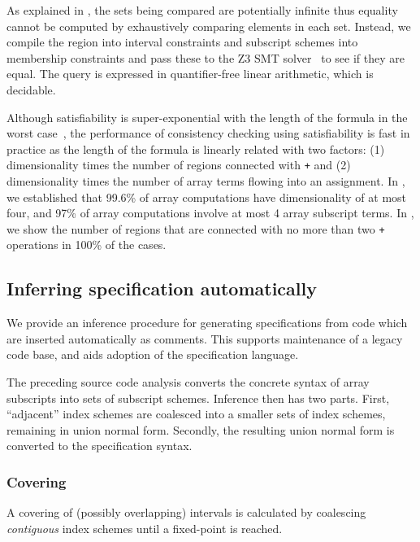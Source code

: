 As explained in , the sets being compared are
potentially infinite thus equality cannot be computed by exhaustively
comparing elements in each set. Instead, we compile the region into
interval constraints and subscript schemes into membership constraints and pass
these to the \textsc{Z3} SMT solver~\citep{de2008z3} to see if they are equal. The
query is expressed in quantifier-free linear arithmetic, which is decidable.

Although satisfiability is super-exponential with the length of the formula in
the worst case~\cite{fischer1974super}, the performance of consistency checking
using satisfiability is fast in practice as the length of the formula is linearly
related with two factors: (1) dimensionality times the number of regions connected
with \texttt{+} and (2) dimensionality times the number of array terms flowing
into an assignment. In , we
established that  99.6\% of array computations have 
dimensionality of at most four, and 97\% of array computations
involve at most 4 array subscript terms. In
, we show the number of regions that are
connected with no more than two \texttt{+} operations in 100\% of the cases.


\subsection{Inferring specification automatically}
\label{subsec:inference}
%
\noindent
We provide an inference procedure for generating specifications from
code which are inserted automatically as comments. This supports
maintenance of a legacy code base, and aids adoption of the
specification language. 

The preceding source code analysis converts the concrete syntax of
array subscripts into sets of subscript schemes. Inference then has
two parts. First, ``adjacent'' index schemes are coalesced into a
smaller sets of index schemes, remaining in union normal
form. Secondly, the resulting union normal form is converted to the
specification syntax.

\subsubsection{Covering}
A covering of (possibly overlapping) intervals is calculated
by coalescing \emph{contiguous} index schemes
until a fixed-point is reached.

